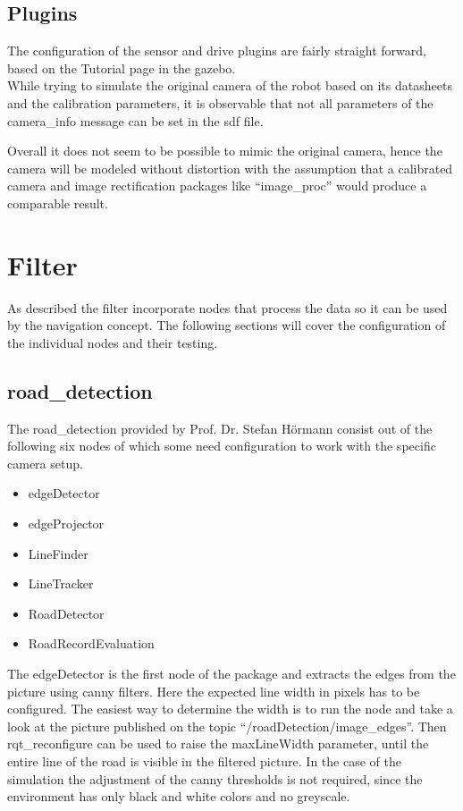 \subsection{Plugins}
The configuration of the sensor and drive plugins are fairly straight forward, based on the Tutorial page in the gazebo\cite{gazebotutorial}.\\



While trying to simulate the original camera of the robot based on its datasheets and the calibration parameters, it is observable that not all parameters of the camera\_info message can be set in the sdf file.

Overall it does not seem to be possible to mimic the original camera, hence the camera will be modeled without distortion with the assumption that a calibrated camera and image rectification packages like ``image\_proc'' would produce a comparable result.



\section{Filter}

As described the filter incorporate nodes that process the data so it can be used by the navigation concept. The following sections will cover the configuration of the individual nodes and their testing.

\subsection{road\_detection}
The road\_detection provided by Prof. Dr. Stefan Hörmann consist out of the following six nodes of which some need configuration to work with the specific camera setup.

\begin{itemize}
	\item edgeDetector
	\item edgeProjector
	\item LineFinder
	\item LineTracker
	\item RoadDetector
	\item RoadRecordEvaluation
\end{itemize}

The edgeDetector is the first node of the package and extracts the edges from the picture using canny filters. Here the expected line width in pixels has to be configured. The easiest way to determine the width is to run the node and take a look at the picture published on the topic ``/roadDetection/image\_edges''. Then rqt\_reconfigure can be used to raise the maxLineWidth parameter, until the entire line of the road is visible in the filtered picture. In the case of the simulation the adjustment of the canny thresholds is not required, since the environment has only black and white colors and no greyscale.\\

